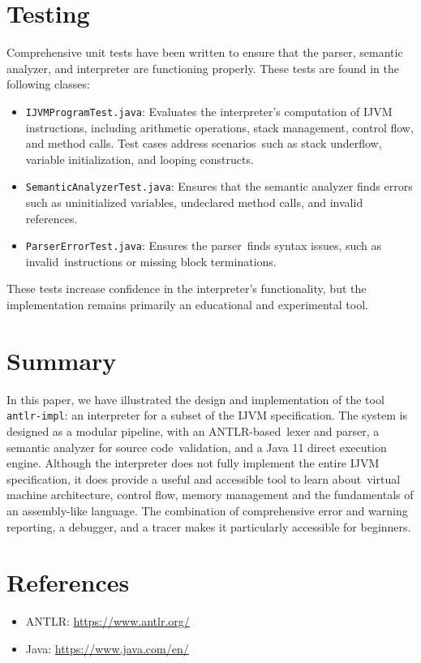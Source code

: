 \documentclass[11pt]{article}
\begin{document}
\section{Testing}
Comprehensive unit tests have been written to ensure that the parser, semantic analyzer, and interpreter are functioning properly. These tests are found in the following classes:

\begin{itemize} 
	\item \texttt{IJVMProgramTest.java}: Evaluates the interpreter's computation of IJVM instructions, including arithmetic operations, stack management, control flow, and method calls. Test cases address scenarios such as stack underflow, variable initialization, and looping constructs.
     \item \texttt{SemanticAnalyzerTest.java}: Ensures that the semantic analyzer finds errors such as uninitialized variables, undeclared method calls, and invalid references.
     \item \texttt{ParserErrorTest.java}: Ensures the parser finds syntax issues, such as invalid instructions or missing block terminations.
\end{itemize}

These tests increase confidence in the interpreter's functionality, but the implementation remains primarily an educational and experimental tool.

\section{Summary}
In this paper, we have illustrated the design and implementation of the tool \texttt{antlr-impl}: an interpreter for a subset of the IJVM specification. The system is designed as a modular pipeline, with an ANTLR-based lexer and parser, a semantic analyzer for source code validation, and a Java 11 direct execution engine. Although the interpreter does not fully implement the entire IJVM specification, it does provide a useful and accessible tool to learn about virtual machine architecture, control flow, memory management and the fundamentals of an assembly-like language. The combination of comprehensive error and warning reporting, a debugger, and a tracer makes it particularly accessible for beginners.

\section*{References}
\begin{itemize}
    \item ANTLR: \url{https://www.antlr.org/}
    \item Java: \url{https://www.java.com/en/}
\end{itemize}
\end{document}
